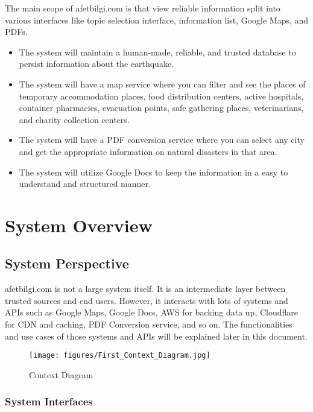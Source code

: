 \documentclass[listof=nochaptergap]{report}
\begin{document}
The main scope of afetbilgi.com is that view reliable information split into various interfaces like topic selection interface, information list, Google Maps, and PDFs.

\begin{itemize}
    \item The system will maintain a human-made, reliable, and trusted database to persist information about the earthquake.
    \item The system will have a map service where you can filter and see the places of temporary accommodation places, food distribution centers, active hospitals, container pharmacies, evacuation points, safe gathering places, veterinarians, and charity collection centers.
    \item The system will have a PDF conversion service where you can select any city and get the appropriate information on natural disasters in that area.
    \item The system will utilize Google Docs to keep the information in a easy to understand and structured manner.
\end{itemize}
\section{System Overview}
    \subsection{System Perspective}

    afetbilgi.com is not a large system itself. It is an intermediate layer between trusted sources and end users. However, it interacts with lots of systems and APIs such as Google Maps, Google Docs, AWS for backing data up, Cloudflare for CDN and caching, PDF Conversion service, and so on. The functionalities and use cases of those systems and APIs will be explained later in this document.
    
        \begin{center}
            \begin{figure}[H]
                \centering
                \texttt{[image: figures/First\_Context\_Diagram.jpg]}
                \caption{Context Diagram} 
                \label{fig:figure1}
            \end{figure}
        \end{center}
            
        \subsubsection{System Interfaces}
            
\end{document}

